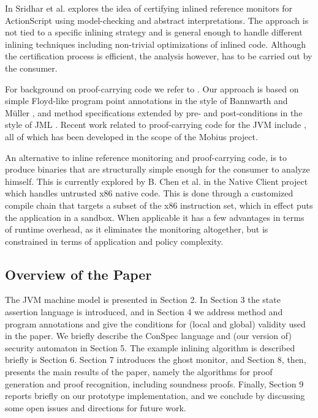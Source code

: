 \documentclass[10pt,twocolumn]{article}
\begin{document}
In \cite{Srid10,Sridb10} Sridhar et al. explores the idea of certifying inlined reference monitors for ActionScript using model-checking and abstract interpretations. The approach is not tied to a specific inlining strategy and is general enough to handle different inlining techniques including non-trivial optimizations of inlined code. Although the certification process is efficient, the analysis however, has to be carried out by the consumer.

For background on proof-carrying code we refer to \cite{Nec97}. Our approach is based on simple Floyd-like program point annotations in the style of Bannwarth and M\"uller \cite{BanMue05}, and method specifications extended by pre- and post-conditions in the style of JML \cite{jmldbc}. Recent work related to proof-carrying code for the JVM include \cite{mobiuspcc}, all of which has been developed in the scope of the Mobius project.

An alternative to inline reference monitoring and proof-carrying code, is to produce binaries that are structurally simple enough for the consumer to analyze himself. This is currently explored by B. Chen et al. in the Native Client project~\cite{nacl} which handles untrusted x86 native code. This is done through a customized compile chain that targets a subset of the x86 instruction set, which in effect puts the application in a sandbox. When applicable it has a few advantages in terms of runtime overhead, as it eliminates the monitoring altogether, but is constrained in terms of application and policy complexity.





\subsection{Overview of the Paper}
The JVM machine model is presented in Section 2. In Section 3 the state assertion language is introduced, and in Section 4 we address method and program annotations and give the conditions for (local and global) validity used in the paper. We briefly describe the ConSpec language and (our version of) security automaton in Section 5. The example inlining algorithm is described briefly is Section 6. Section 7 introduces the ghost monitor, and Section 8, then, presents the main results of the paper, namely the algorithms for proof generation and proof recognition, including soundness proofs. Finally, Section 9 reports briefly on our prototype implementation, and we conclude by discussing some open issues and directions for future work.
\end{document}
